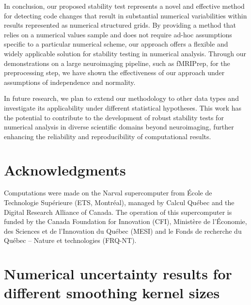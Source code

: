 \documentclass[lettersize,journal]{IEEEtran}
\newcommand{\fmriprep}{fMRIPrep\xspace}
\begin{document}
In conclusion, our proposed stability test represents a novel and effective method for detecting code changes that result in substantial numerical variabilities within results represented as numerical structured grids. By providing a method that relies on a numerical values sample and does not require ad-hoc assumptions specific to a particular numerical scheme, our approach offers a flexible and widely applicable solution for stability testing in numerical analysis.
Through our demonstrations on a large neuroimaging pipeline, such as \fmriprep, for the preprocessing step, we have shown the effectiveness of our approach under assumptions of independence and normality.

In future research, we plan to extend our methodology to other data types and investigate its applicability under different statistical hypotheses. This work has the potential to contribute to the development of robust stability tests for numerical analysis in diverse scientific domains beyond neuroimaging, further enhancing the reliability and reproducibility of computational results.

\section{Acknowledgments}

Computations were made on the Narval supercomputer from \'Ecole de Technologie
Sup\'erieure (ETS, Montr\'eal), managed by Calcul Québec and the Digital Research Alliance of Canada. The
operation of this supercomputer is funded by the Canada Foundation for
Innovation (CFI), Ministère de l’Économie, des Sciences et de l’Innovation du
Québec (MESI) and le Fonds de recherche du Québec – Nature et technologies
(FRQ-NT).





\appendix

\section{Numerical uncertainty results for different smoothing kernel sizes}
\label{appendix:numerical_uncertainty}
\end{document}
